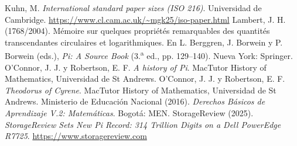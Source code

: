 \documentclass[11pt]{article}
\begin{document}
\begin{referencias}
 Kuhn, M. \emph{International standard paper sizes (ISO 216)}.
  Universidad de Cambridge. \url{https://www.cl.cam.ac.uk/~mgk25/iso-paper.html}
 Lambert, J. H. (1768/2004). Mémoire sur quelques propriétés
  remarquables des quantités transcendantes circulaires et logarithmiques.
  En L. Berggren, J. Borwein y P. Borwein (eds.), \emph{Pi: A Source Book}
  (3.\textsuperscript{a} ed., pp. 129--140). Nueva York: Springer.
 O'Connor, J. J. y Robertson, E. F. \emph{A history of Pi}.
  MacTutor History of Mathematics, Universidad de St Andrews.
 O'Connor, J. J. y Robertson, E. F. \emph{Theodorus
  of Cyrene}. MacTutor History of Mathematics, Universidad de St Andrews.
 Ministerio de Educación Nacional (2016). \emph{Derechos
  Básicos de Aprendizaje V.2: Matemáticas}. Bogotá: MEN.
 StorageReview (2025). \emph{StorageReview Sets New Pi
  Record: 314 Trillion Digits on a Dell PowerEdge R7725}.
  \url{https://www.storagereview.com}
\end{referencias}
\end{document}

